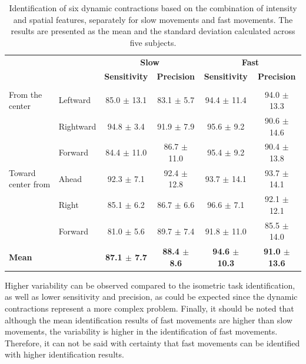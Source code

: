 \begin{table}[]
\centering
\caption{Identification of six dynamic contractions based on the combination of intensity and spatial features, separately for slow movements and fast movements. The results are presented as the mean and the standard deviation calculated across five subjects.}
\label{tb:4-4}
\begin{tabular}{llcccc}
                   &           & \multicolumn{2}{c}{\textbf{Slow}}           & \multicolumn{2}{c}{\textbf{Fast}}           \\
                   &           & \textbf{Sensitivity} & \textbf{Precision}   & \textbf{Sensitivity} & \textbf{Precision}   \\ \hline
                   &           & \multicolumn{1}{l}{} & \multicolumn{1}{l}{} & \multicolumn{1}{l}{} & \multicolumn{1}{l}{} \\
From the center    & Leftward  & 85.0 $\pm$ 13.1          & 83.1 $\pm$ 5.7           & 94.4 $\pm$ 11.4          & 94.0 $\pm$ 13.3          \\
                   & Rightward & 94.8 $\pm$ 3.4           & 91.9 $\pm$ 7.9           & 95.6 $\pm$ 9.2           & 90.6 $\pm$ 14.6          \\
                   & Forward   & 84.4 $\pm$ 11.0          & 86.7 $\pm$ 11.0          & 95.4 $\pm$ 9.2           & 90.4 $\pm$ 13.8          \\ \hline
Toward center from & Ahead     & 92.3 $\pm$ 7.1           & 92.4 $\pm$ 12.8          & 93.7 $\pm$ 14.1          & 93.7 $\pm$ 14.1          \\
                   & Right     & 85.1 $\pm$ 6.2           & 86.7 $\pm$ 6.6           & 96.6 $\pm$ 7.1           & 92.1 $\pm$ 12.1          \\
                   & Forward   & 81.0 $\pm$ 5.6           & 89.7 $\pm$ 7.4           & 91.8 $\pm$ 11.0          & 85.5 $\pm$ 14.0          \\ \hline
\textbf{Mean}      & \textbf{} & \textbf{87.1 $\pm$ 7.7}  & \textbf{88.4 $\pm$ 8.6}  & \textbf{94.6 $\pm$ 10.3} & \textbf{91.0 $\pm$ 13.6}
\end{tabular}
\end{table}

Higher variability can be observed compared to the isometric task identification, as well as lower sensitivity and precision, as could be expected since the dynamic contractions represent a more complex problem. Finally, it should be noted that although the mean identification results of fast movements are higher than slow movements, the variability is higher in the identification of fast movements. Therefore, it can not be said with certainty that fast movements can be identified with higher identification results.


